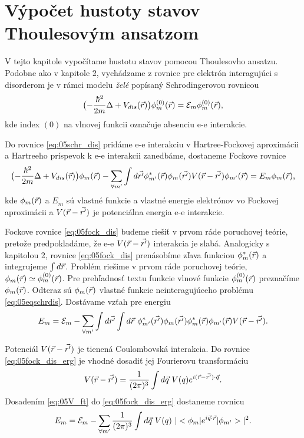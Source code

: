 \section{Výpočet hustoty stavov Thoulesovým ansatzom}
V tejto kapitole vypočítame hustotu stavov pomocou Thoulesovho ansatzu. 
Podobne ako v kapitole 2, vychádzame z rovnice pre elektrón interagujúci s disorderom je v rámci modelu {\it želé} popísaný Schrodingerovou rovnicou
\begin{equation}
\label{eq:05schr_dis}
\bigl(-\frac{\hbar^2}{2m}\laplace + V_{dis}(\vr)\bigr)\phi_m^{(0)}(\vr)=\E_m\phi_m^{(0)}(\vr) \text{,}
\end{equation}
kde index $(0)$ na vlnovej funkcii označuje absenciu e-e interakcie.

Do rovnice \eqref{eq:05schr_dis} pridáme e-e interakciu v Hartree-Fockovej aproximácii a Hartreeho príspevok k e-e interakcii zanedbáme, dostaneme Fockove rovnice
\begin{equation}
 \label{eq:05fock_dis}
 \bigl(-\frac{\hbar^2}{2m}\laplace + V_{dis}(\vr) \bigr)\phi_m(\vr)-\sum_{\forall m'} \int d\vrp \phi^*_{m'}(\vr)\phi_{m}(\vrp)V(\vr-\vrp)\phi_{m'}(\vr)=E_m\phi_m(\vr) \text{,}
\end{equation}
kde $\phi_m(\vec{r})$ a $E_m$ sú vlastné funkcie a vlastné energie elektrónov vo Fockovej aproximácii a $V(\vec{r}-\vec{r'})$ je potenciálna energia e-e interakcie.

Fockove rovnice \eqref{eq:05fock_dis} budeme riešiť v prvom ráde poruchovej teórie, pretože predpokladáme, že e-e $V(\vec{r}-\vec{r'})$ interakcia je slabá. Analogicky s kapitolou 2,
rovnice \eqref{eq:05fock_dis} prenásobíme zľava funkciou $\phi^*_m(\vec{r})$ a integrujeme $\int d\vec{r}$. Problém riešime v prvom ráde poruchovej teórie, $\phi_m(\vec{r}) \simeq \phi_m^{(0)}(\vec{r})$. Pre prehľadnosť textu funkcie vlnové funkcie $\phi_m^{(0)}(\vec{r})$ preznačíme  $\phi_m(\vec{r})$. Odteraz sú $\phi_m(\vec{r})$ vlastné funkcie neinteragujúceho problému \eqref{eq:05eqschrdis}. Dostávame vzťah pre energiu 
\begin{equation}
 \label{eq:05fock_dis_erg}
 E_m=\E_m-\sum_{\forall m'} \int d\vrp \int d\vr\ \phi^*_{m'}(\vrp) \phi_{m}(\vrp)\phi^*_{m}(\vr)\phi_{m'}(\vr)V(\vr-\vrp) \text{.}
\end{equation}

Potenciál $V(\vec{r}-\vec{r'})$ je tienená Coulombovská interakcia. Do rovnice \eqref{eq:05fock_dis_erg} je vhodné dosadiť jej Fourierovu transformáciu
\begin{equation}
 \label{eq:05V_ft}
 V(\vr-\vrp)=\ftkvec{(\vr-\vrp)}{\vq}{V(q)}\text{.}
\end{equation}
Dosadením \eqref{eq:05V_ft} do \eqref{eq:05fock_dis_erg} dostaneme rovnicu 
\begin{equation}
\label{eq:05erg_V_ft}
 E_m=\E_m-\sum_{\forall m'}\frac{1}{(2\pi)^{3}} \int d\vq\ V(q) \ |\bra{\phi_m}e^{i\vq\cdot\vr}\ket{\phi_{m'}}|^2 \text{.}
\end{equation}

